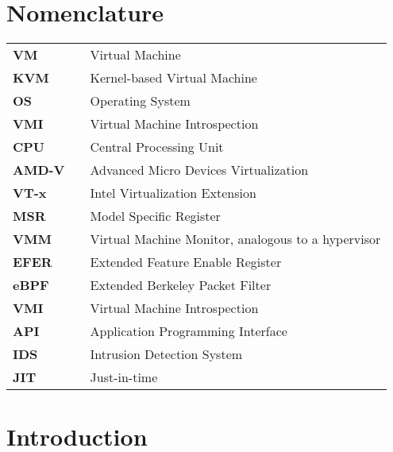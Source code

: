 \documentclass{report}
\begin{document}
\begin{spacing}{1.5}

\newpage
\chapter*{Nomenclature}

\begin{tabular}{lcl}
\large{\bf VM}  & & \large{Virtual Machine} \\
\large{\bf KVM}  & & \large{Kernel-based Virtual Machine} \\
\large{\bf OS}   & & \large{Operating System}        \\
\large{\bf VMI}  & & \large{Virtual Machine Introspection} \\
\large{\bf CPU}  & & \large{Central Processing Unit} \\
\large{\bf AMD-V}  & & \large{Advanced Micro Devices Virtualization} \\
\large{\bf VT-x}  & & \large{Intel Virtualization Extension} \\
\large{\bf MSR}  & & \large{Model Specific Register} \\
\large{\bf VMM}  & & \large{Virtual Machine Monitor, analogous to a hypervisor} \\
\large{\bf EFER}  & & \large{Extended Feature Enable Register} \\
\large{\bf eBPF}  & & \large{Extended Berkeley Packet Filter} \\
\large{\bf VMI}  & & \large{Virtual Machine Introspection} \\
\large{\bf API}  & & \large{Application Programming Interface} \\
\large{\bf IDS}  & & \large{Intrusion Detection System} \\
\large{\bf JIT}  & & \large{Just-in-time} \\
\end{tabular}
















\newpage
\chapter{Introduction}



\end{spacing}
\end{document}
